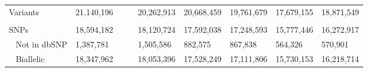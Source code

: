 \documentclass[../main.tex]{subfiles}
\begin{document}
\begin{landscape}
\begin{table}
\begin{tabular}{|l|l|l|l|l|l|l|}
        \arrayrulecolor{black}\hline
        Variants                                    & 21,140,196                                                               & 20,262,913                                                                     & 20,668,459                                                                   & 19,761,679                                                               & 17,679,155                                                                     & 18,871,549                                                                    \\ 
        \arrayrulecolor{black}\hline
        \multicolumn{7}{|l|}{~}                                                                                                                                                                                                                                                                                                                                                                                                                                                                                                            \\ 
        \hline
        SNPs                                        & 18,594,182                                                               & 18,120,724                                                                     & 17,592,038                                                                   & 17,248,593                                                               & 15,777,446                                                                     & 16,272,917                                                                    \\ 
        \hline
        ~ Not in dbSNP                              & 1,387,781~~~~~                                                           & 1,505,586                                                                      & 882,575                                                                      & 867,838                                                                  & 564,326                                                                        & 570,901                                                                       \\ 
        \hline
        ~ Biallelic                                 & 18,347,962                                                               & 18,053,396                                                                     & 17,528,249                                                                   & 17,111,806                                                               & 15,730,153                                                                     & 16,218,714                                                                    \\ 

\end{tabular}
\end{table}
\end{landscape}
\end{document}

